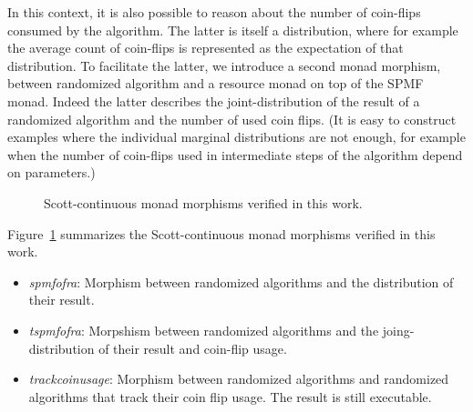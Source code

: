 \documentclass[11pt,a4paper]{article}
\begin{document}
In this context, it is also possible to reason about the number of coin-flips consumed by the
algorithm. The latter is itself a distribution, where for example the average count of coin-flips
is represented as the expectation of that distribution. To facilitate the latter, we introduce
a second monad morphism, between randomized algorithm and a resource monad on top of the SPMF monad.
Indeed the latter describes the joint-distribution of the result of a randomized algorithm and the 
number of used coin flips. (It is easy to construct examples where the individual marginal
distributions are not enough, for example when the number of coin-flips used in intermediate steps
of the algorithm depend on parameters.)

\begin{figure}
\centering
{}
\caption{Scott-continuous monad morphisms verified in this work.}
\label{fig:morphisms}
\end{figure}

Figure~\ref{fig:morphisms} summarizes the Scott-continuous monad morphisms verified in this work.

\begin{itemize}
\item \emph{spmf{\isacharunderscore}of{\isacharunderscore}ra}: Morphism between randomized 
algorithms and the distribution of their result.
\item \emph{tspmf{\isacharunderscore}of{\isacharunderscore}ra}: Morpshism between randomized
algorithms and the joing-distribution of their result and coin-flip usage.
\item \emph{track{\isacharunderscore}coin{\isacharunderscore}usage}: Morphism between randomized algorithms and randomized algorithms
that track their coin flip usage. The result is still executable.
\end{itemize}
\end{document}
